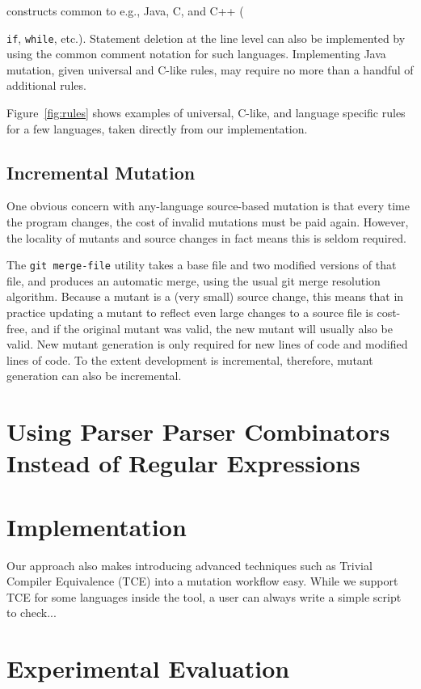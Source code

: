 \documentclass[sigconf,review, anonymous]{acmart}
\begin{document}
constructs common to e.g.,  Java, C, and C++ ({{\tt if}, {\tt while},
  etc.).  Statement deletion at the line level can also be implemented
  by using the common comment notation for such languages.
  Implementing Java mutation, given universal and C-like rules, may
  require no more than a handful of additional rules.

  Figure~\ref{fig:rules} shows examples of universal, C-like, and
  language specific rules for a few languages, taken directly from our
  implementation.  


\subsection{Incremental Mutation}

One obvious concern with any-language source-based mutation is that every time the
program changes, the cost of invalid mutations must be paid again.
However, the locality of mutants and source changes in fact means this
is seldom required.

The {\tt git merge-file} utility takes a base file and two modified
versions of that file, and produces an automatic merge, using the
usual git merge resolution algorithm.    Because a mutant is a (very
small) source change, this means that in practice updating a mutant to
reflect even large changes to a source file is cost-free, and if the
original mutant was valid, the new mutant will usually also be valid.
New mutant generation is only required for new lines of code and
modified lines of code.  To the extent development is incremental,
therefore, mutant generation can also be incremental.

\section{Using Parser Parser Combinators Instead of Regular Expressions}

\section{Implementation}

Our approach also makes introducing advanced techniques such as
Trivial Compiler Equivalence (TCE) into a mutation workflow easy.
While we support TCE for some languages inside the tool, a user can
always write a simple script to check...

\section{Experimental Evaluation}

}
\end{document}

